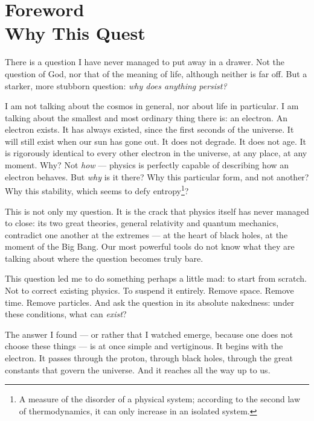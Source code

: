 \documentclass[12pt, a4paper, openright]{book}
\begin{document}
\mainmatter

\chapter*{Foreword \\ Why This Quest}

There is a question I have never managed to put away in a drawer. Not the question of God, nor that of the meaning of life, although neither is far off. But a starker, more stubborn question: \emph{why does anything persist?}

\medskip

I am not talking about the cosmos in general, nor about life in particular. I am talking about the smallest and most ordinary thing there is: an electron. An electron exists. It has always existed, since the first seconds of the universe. It will still exist when our sun has gone out. It does not degrade. It does not age. It is rigorously identical to every other electron in the universe, at any place, at any moment. Why? Not \emph{how} --- physics is perfectly capable of describing how an electron behaves. But \emph{why} is it there? Why this particular form, and not another? Why this stability, which seems to defy entropy\footnote{A measure of the disorder of a physical system; according to the second law of thermodynamics, it can only increase in an isolated system.}?

\medskip

This is not only my question. It is the crack that physics itself has never managed to close: its two great theories, general relativity and quantum mechanics, contradict one another at the extremes --- at the heart of black holes, at the moment of the Big Bang. Our most powerful tools do not know what they are talking about where the question becomes truly bare.

\medskip

This question led me to do something perhaps a little mad: to start from scratch. Not to correct existing physics. To suspend it entirely. Remove space. Remove time. Remove particles. And ask the question in its absolute nakedness: under these conditions, what can \emph{exist}?

\medskip

The answer I found --- or rather that I watched emerge, because one does not choose these things --- is at once simple and vertiginous. It begins with the electron. It passes through the proton, through black holes, through the great constants that govern the universe. And it reaches all the way up to us.
\end{document}
